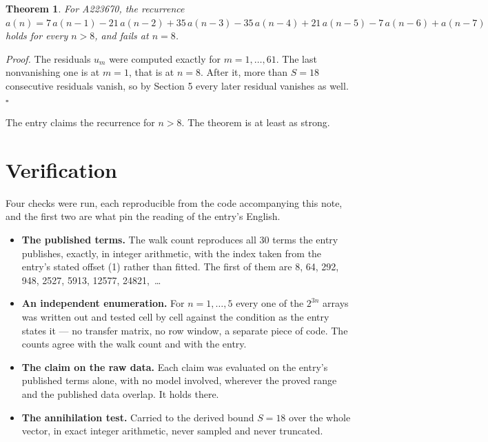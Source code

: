 \documentclass[11pt]{article}
\newtheorem{theorem}{Theorem}
\theoremstyle{definition}
\begin{document}
\begin{theorem} For A223670, the recurrence $a(n) = 7\,a(n-1) - 21\,a(n-2) + 35\,a(n-3) - 35\,a(n-4) + 21\,a(n-5) - 7\,a(n-6) + a(n-7)$ holds for every $n > 8$, and fails at $n = 8$.\end{theorem}

{\itshape Proof.} The residuals $u_m$ were computed exactly for $m = 1,\dots,61$. The last nonvanishing one is at $m = 1$, that is at $n = 8$. After it, more than $S = 18$ consecutive residuals vanish, so by Section 5 every later residual vanishes as well. $\square$

The entry claims the recurrence for $n > 8$. The theorem is at least as strong.

\section{Verification}

Four checks were run, each reproducible from the code accompanying this note, and the first two are what pin the reading of the entry's English.

\begin{itemize}

\item {\bfseries The published terms.} The walk count reproduces all 30 terms the entry publishes, exactly, in integer arithmetic, with the index taken from the entry's stated offset (1) rather than fitted. The first of them are 8, 64, 292, 948, 2527, 5913, 12577, 24821,~\dots

\item {\bfseries An independent enumeration.} For $n = 1,\dots,5$ every one of the $2^{3n}$ arrays was written out and tested cell by cell against the condition as the entry states it --- no transfer matrix, no row window, a separate piece of code. The counts agree with the walk count and with the entry.

\item {\bfseries The claim on the raw data.} Each claim was evaluated on the entry's published terms alone, with no model involved, wherever the proved range and the published data overlap. It holds there.

\item {\bfseries The annihilation test.} Carried to the derived bound $S = 18$ over the whole vector, in exact integer arithmetic, never sampled and never truncated.

\end{itemize}
\end{document}
